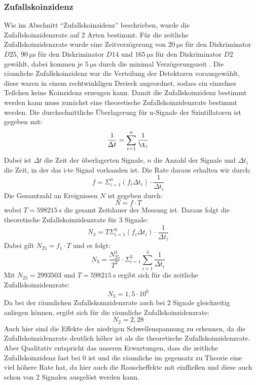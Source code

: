 \documentclass{article}
\begin{document}
\subsubsection*{Zufallskoinzidenz}
Wie im Abschnitt \enquote{Zufallskoinzidenz} beschrieben, wurde die Zufallskoinzidenzrate auf 2 Arten bestimmt.
Für die zeitliche Zufallskoinzidenzrate wurde eine Zeitverzögerung von $\SI{20}{\micro\second}$ für den Diskriminator $D25$, $\SI{90}{\micro\second}$ für den Diskriminator $D14$ und 
$\SI{165}{\micro\second}$ für den Diskriminator $D2$ gewählt, dabei kommen je $\SI{5}{\micro\second}$ durch die minimal Verzögerungszeit \cite{}.
Die räumliche Zufallskoinzidenz war die Verteilung der Detektoren vorausgewählt, diese waren in einem rechtwinkligen Dreieck angeordnet, sodass ein einzelnes Teilchen keine Koinzidenz erzeugen kann.
Damit die Zufallskoinzidenz bestimmt werden kann muss zunächst eine theoretische Zufallskoinzidenzrate bestimmt werden.
Die durchschnittliche Überlagerung für n-Signale der Szintillatoren ist gegeben mit:
\begin{displaymath}
    \frac{1}{\Delta t}= \sum_{i=1}^{n} \frac{1}{\t_i}
\end{displaymath}
Dabei ist $\Delta t$ die Zeit der überlagerten Signale, $n$ die Anzahl der Signale und $\Delta t_i$ die Zeit, in der das i-te Signal vorhanden ist.
Die Rate daraus erhalten wir durch:
\begin{displaymath}
    f=\Sigma_{i=1}^{n} (f_i \Delta t_i) \cdot \frac{1}{\Delta t_i}
\end{displaymath}
Die Gesamtzahl an Ereignissen $N$ ist gegeben durch:
\begin{displaymath}
    N = f \cdot T
\end{displaymath}
wobei $T=\SI{598215}{\second}$ die gesamt Zeitdauer der Messung ist.
Daraus folgt die theoretische Zufallskoinzidenzrate für 3 Signale:
\begin{displaymath}
    N_3=T\Sigma_{i=1}^{3} (f_i \Delta t_i) \cdot \frac{1}{\Delta t_i}
\end{displaymath}
Dabei gilt $N_{25}=f_1 \cdot T$ und es folgt:
\begin{displaymath}
    N_3 = \frac{N_{25}^3}{T^2} \cdot \Sigma_{i=1}^{3} \sum_{i=1}^{3}\frac{1}{\Delta t_i}
\end{displaymath}
Mit $N_{25}=2993503$ und $T=\SI{598215}{\second}$ ergibt sich für die zeitliche Zufallskoinzidenzrate:
\begin{displaymath}
    N_3 = 1,5 \cdot 10^6    
\end{displaymath}
Da bei der räumlichen Zufallskoinzidenzrate auch bei 2 Signale gleichzeitig anliegen können, ergibt sich für die räumliche Zufallskoinzidenzrate:
\begin{displaymath}
    N_2 = 2,28
\end{displaymath}
Auch hier sind die Effekte der niedrigen Schwellenspannung zu erkennen, da die Zufallskoinzidenzrate deutlich höher ist als die theoretische Zufallskoinzidenzrate.
Aber Qualitativ entspricht das unseren Erwartungen, dass die zeitliche Zufallskoinzidenz fast bei 0 ist und die räumliche im gegensatz zu Theorie eine viel höhere Rate hat, da hier auch die
Rauscheffekte mit einfließen und diese auch schon von 2 Signalen ausgelöst werden kann. 
\end{document}
